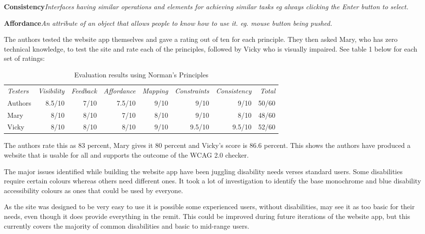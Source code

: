 \documentclass{ueacmpstyle}
\renewcommand{\paragraph}[1]{\par\textbf{#1}\hspace{0.3em}}
\begin{document}
{{\paragraph{Consistency}\textit{Interfaces having similar operations and elements for achieving similar tasks eg always clicking the Enter button to select.} 
\paragraph{Affordance}\textit{An attribute of an object that allows people to know how to use it. eg. mouse button being pushed.}

The authors tested the website app themselves and gave a rating out of ten for each principle. They then asked Mary, who has zero technical knowledge, to test the site and rate each of the principles, followed by Vicky who is visually impaired. See table 1 below for each set of ratings:

\begin{table}[h!]
	\centering 
	\caption{Evaluation results using Norman's Principles}\label{textresult}
	\begin{tabular}{|lrrrrrrr|} \hline
		\textit{Testers} & \textit{Visibility} & \textit{Feedback} & \textit{Affordance} & \textit{Mapping} & \textit{Constraints} & \textit{Consistency} & \textit{Total} \\
		Authors & 8.5/10 & 7/10 & 7.5/10 & 9/10 & 9/10 & 9/10 & 50/60 \\
		Mary & 8/10 & 8/10 & 7/10 & 8/10 & 9/10 & 8/10 & 48/60 \\
		Vicky & 8/10 & 8/10 & 8/10 & 9/10 & 9.5/10 & 9.5/10 & 52/60 \\
		\hline
	\end{tabular}
\end{table}

The authors rate this as 83 percent, Mary gives it 80 percent and Vicky's score is 86.6 percent. This shows the authors have produced a website that is usable for all and supports the outcome of the WCAG 2.0 checker. 

The major issues identified while building the website app have been juggling disability needs verses standard users. Some disabilities require certain colours whereas others need different ones. It took a lot of investigation to identify the base monochrome and blue disability accessibility colours as ones that could be used by everyone.

As the site was designed to be very easy to use it is possible some experienced users, without disabilities, may see it as too basic for their needs, even though it does provide everything in the remit. This could be improved during future iterations of the website app, but this currently covers the majority of common disabilities and basic to mid-range users.  

}}
\end{document}

